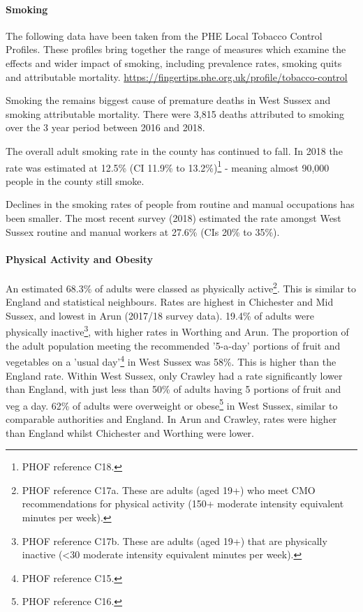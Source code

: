 \paragraph{Smoking}
The following data have been taken from the PHE Local Tobacco Control Profiles. These profiles bring together the range of measures which examine the effects and wider impact of smoking, including prevalence rates, smoking quits and attributable mortality. \url{https://fingertips.phe.org.uk/profile/tobacco-control}

Smoking the remains biggest cause of premature deaths in West Sussex and smoking attributable mortality. There were 3,815 deaths attributed to smoking over the 3 year period between 2016 and 2018.

The overall adult smoking rate in the county has continued to fall. In 2018 the rate was estimated at 12.5\% (CI 11.9\% to 13.2\%)\footnote{PHOF reference C18.} - meaning almost 90,000 people in the county still smoke.

Declines in the smoking rates of people from routine and manual occupations has been smaller. The most recent survey (2018) estimated the rate amongst West Sussex routine and manual workers at 27.6\% (CIs 20\% to 35\%).

\paragraph{Physical Activity and Obesity} An estimated 68.3\% of adults were classed as physically active\footnote{PHOF reference C17a. These are adults (aged 19+) who meet CMO recommendations for physical activity (150+ moderate intensity equivalent minutes per week).}. This is similar to England and statistical neighbours. Rates are highest in Chichester and Mid Sussex, and lowest in Arun (2017/18 survey data). 19.4\% of adults were physically inactive\footnote{PHOF reference C17b. These are adults (aged 19+) that are physically inactive (<30 moderate intensity equivalent minutes per week).}, with higher rates in Worthing and Arun. The proportion of the adult population meeting the recommended '5-a-day' portions of fruit and vegetables on a 'usual day'\footnote{PHOF reference C15.} in West Sussex was 58\%. This is higher than the England rate. Within West Sussex, only Crawley had a rate significantly lower than England, with just less than 50\% of adults having 5 portions of fruit and veg a day. 62\% of adults were overweight or obese\footnote{PHOF reference C16.} in West Sussex, similar to comparable authorities and England. In Arun and Crawley, rates were higher than England whilst Chichester and Worthing were lower.

